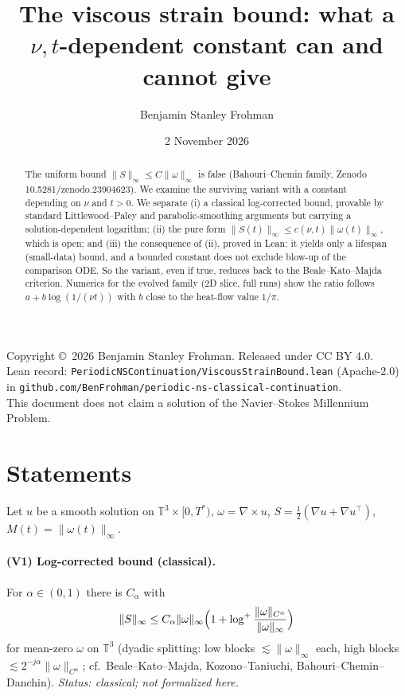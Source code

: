 \documentclass[11pt]{article}
\title{The viscous strain bound: what a $\nu,t$-dependent constant can and cannot give}
\author{Benjamin Stanley Frohman}
\date{2 November 2026}
\theoremstyle{definition}\newtheorem{definition}{Definition}
\begin{document}
\maketitle
\begin{center}Copyright \copyright\ 2026 Benjamin Stanley Frohman. Released under CC BY 4.0.\\
Lean record: \texttt{PeriodicNSContinuation/ViscousStrainBound.lean} (Apache-2.0) in \texttt{github.com/BenFrohman/periodic-ns-classical-continuation}.\\
This document does not claim a solution of the Navier--Stokes Millennium Problem.\end{center}

\begin{abstract}
The uniform bound $\|S\|_\infty\le C\|\omega\|_\infty$ is false (Bahouri--Chemin family, Zenodo 10.5281/zenodo.23904623). We examine the surviving variant with a constant depending on $\nu$ and $t>0$. We separate (i) a classical log-corrected bound, provable by standard Littlewood--Paley and parabolic-smoothing arguments but carrying a solution-dependent logarithm; (ii) the pure form $\|S(t)\|_\infty\le c(\nu,t)\|\omega(t)\|_\infty$, which is open; and (iii) the consequence of (ii), proved in Lean: it yields only a lifespan (small-data) bound, and a bounded constant does not exclude blow-up of the comparison ODE. So the variant, even if true, reduces back to the Beale--Kato--Majda criterion. Numerics for the evolved family (2D slice, full runs) show the ratio follows $a+b\log(1/(\nu t))$ with $b$ close to the heat-flow value $1/\pi$.
\end{abstract}

\section{Statements}
Let $u$ be a smooth solution on $\mathbb{T}^3\times[0,T^*)$, $\omega=\nabla\times u$, $S=\tfrac12(\nabla u+\nabla u^{\top})$, $M(t)=\|\omega(t)\|_\infty$.

\paragraph{(V1) Log-corrected bound (classical).} For $\alpha\in(0,1)$ there is $C_\alpha$ with
\[
\|S\|_\infty\le C_\alpha\|\omega\|_\infty\Bigl(1+\log^+\frac{\|\omega\|_{C^\alpha}}{\|\omega\|_\infty}\Bigr)
\]
for mean-zero $\omega$ on $\mathbb{T}^3$ (dyadic splitting: low blocks $\lesssim\|\omega\|_\infty$ each, high blocks $\lesssim2^{-j\alpha}\|\omega\|_{C^\alpha}$; cf.\ Beale--Kato--Majda, Kozono--Taniuchi, Bahouri--Chemin--Danchin). \emph{Status: classical; not formalized here.}
\end{document}
